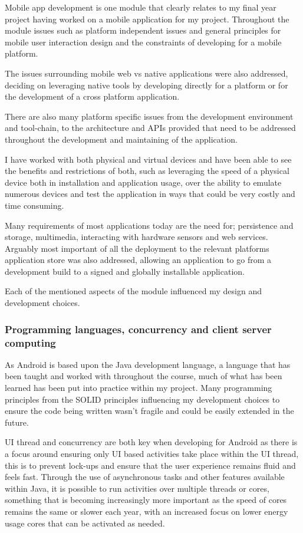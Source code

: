 Mobile app development is one module that clearly relates to my final
year project having worked on a mobile application for my project.
Throughout the module issues such as platform independent issues and
general principles for mobile user interaction design and the
constraints of developing for a mobile platform.

The issues surrounding mobile web vs native applications were also
addressed, deciding on leveraging native tools by developing directly
for a platform or for the development of a cross platform application.

There are also many platform specific issues from the development
environment and tool-chain, to the architecture and APIs provided that
need to be addressed throughout the development and maintaining of the
application.

I have worked with both physical and virtual devices and have been able
to see the benefits and restrictions of both, such as leveraging the
speed of a physical device both in installation and application usage,
over the ability to emulate numerous devices and test the application in
ways that could be very costly and time consuming.

Many requirements of most applications today are the need for;
persistence and storage, multimedia, interacting with hardware sensors
and web services. Arguably most important of all the deployment to the
relevant platforms application store was also addressed, allowing an
application to go from a development build to a signed and globally
installable application.

Each of the mentioned aspects of the module influenced my design and
development choices.

\subsubsection{Programming languages, concurrency and client server
computing}\label{programming-languages-concurrency-and-client-server-computing}

As Android is based upon the Java development language, a language that
has been taught and worked with throughout the course, much of what has
been learned has been put into practice within my project. Many
programming principles from the SOLID principles influencing my
development choices to ensure the code being written wasn't fragile and
could be easily extended in the future.

UI thread and concurrency are both key when developing for Android as
there is a focus around ensuring only UI based activities take place
within the UI thread, this is to prevent lock-ups and ensure that the
user experience remains fluid and feels fast. Through the use of
asynchronous tasks and other features available within Java, it is
possible to run activities over multiple threads or cores, something
that is becoming increasingly more important as the speed of cores
remains the same or slower each year, with an increased focus on lower
energy usage cores that can be activated as needed.

